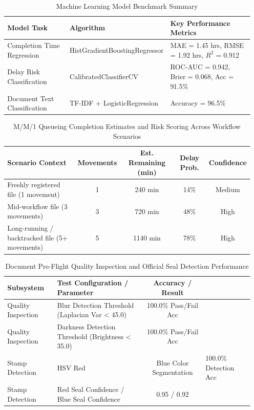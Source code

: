 \vspace{1em}

\begin{table}[htbp]
\centering
\caption{Machine Learning Model Benchmark Summary}
\label{tab:ml_models_evaluation}
\begin{tabular}{lll}
\toprule
\textbf{Model Task} & \textbf{Algorithm} & \textbf{Key Performance Metrics} \\
\midrule
Completion Time Regression & HistGradientBoostingRegressor & MAE = 1.45 hrs, RMSE = 1.92 hrs, $R^2$ = 0.912 \\
Delay Risk Classification & CalibratedClassifierCV & ROC-AUC = 0.942, Brier = 0.068, Acc = 91.5\% \\
Document Text Classification & TF-IDF + LogisticRegression & Accuracy = 96.5\% \\
\bottomrule
\end{tabular}
\end{table}

\vspace{1em}

\begin{table}[htbp]
\centering
\caption{M/M/1 Queueing Completion Estimates and Risk Scoring Across Workflow Scenarios}
\label{tab:queueing_scenarios}
\begin{tabular}{lcccc}
\toprule
\textbf{Scenario Context} & \textbf{Movements} & \textbf{Est. Remaining (min)} & \textbf{Delay Prob.} & \textbf{Confidence} \\
\midrule
Freshly registered file (1 movement) & 1 & 240 min & 14\% & Medium \\
Mid-workflow file (3 movements) & 3 & 720 min & 48\% & High \\
Long-running / backtracked file (5+ movements) & 5 & 1140 min & 78\% & High \\
\bottomrule
\end{tabular}
\end{table}

\vspace{1em}

\begin{table}[htbp]
\centering
\caption{Document Pre-Flight Quality Inspection and Official Seal Detection Performance}
\label{tab:stamp_and_quality}
\begin{tabular}{llc}
\toprule
\textbf{Subsystem} & \textbf{Test Configuration / Parameter} & \textbf{Accuracy / Result} \\
\midrule
Quality Inspection & Blur Detection Threshold (Laplacian Var < 45.0) & 100.0\% Pass/Fail Acc \\
Quality Inspection & Darkness Detection Threshold (Brightness < 35.0) & 100.0\% Pass/Fail Acc \\
Stamp Detection & HSV Red & Blue Color Segmentation & 100.0\% Detection Acc \\
Stamp Detection & Red Seal Confidence / Blue Seal Confidence & 0.95 / 0.92 \\
\bottomrule
\end{tabular}
\end{table}
